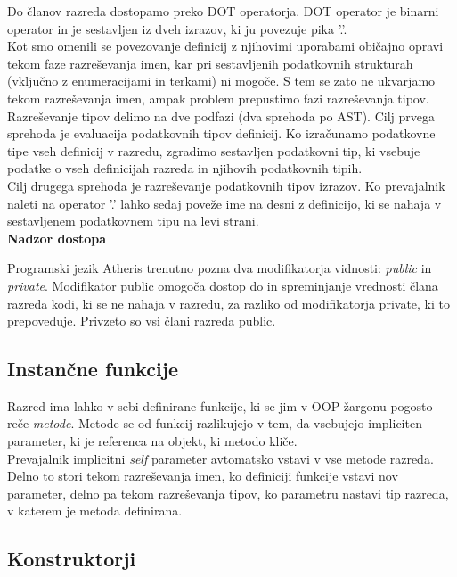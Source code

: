 \documentclass[a4paper, 12p]{book}
\begin{document}
Do članov razreda dostopamo preko DOT operatorja. DOT operator je binarni operator in je sestavljen iz dveh izrazov, ki ju povezuje pika '.'. \\
\indent Kot smo omenili se povezovanje definicij z njihovimi uporabami običajno opravi tekom faze razreševanja imen, kar pri sestavljenih podatkovnih strukturah (vključno z enumeracijami in terkami) ni mogoče. S tem se zato ne ukvarjamo tekom razreševanja imen, ampak problem prepustimo fazi razreševanja tipov. \\
\indent Razreševanje tipov delimo na dve podfazi (dva sprehoda po AST). Cilj prvega sprehoda je evaluacija podatkovnih tipov definicij. Ko izračunamo podatkovne tipe vseh definicij v razredu, zgradimo sestavljen podatkovni tip, ki vsebuje podatke o vseh definicijah razreda in njihovih podatkovnih tipih. \\ 
\indent Cilj drugega sprehoda je razreševanje podatkovnih tipov izrazov. Ko prevajalnik naleti na operator '.' lahko sedaj poveže ime na desni z definicijo, ki se nahaja v sestavljenem podatkovnem tipu na levi strani.\\

\noindent \textbf{Nadzor dostopa}

\noindent Programski jezik Atheris trenutno pozna dva modifikatorja vidnosti: \textit{public} in \textit{private}. Modifikator public omogoča dostop do in spreminjanje vrednosti člana razreda kodi, ki se ne nahaja v razredu, za razliko od modifikatorja private, ki to prepoveduje. Privzeto so vsi člani razreda public. 
\subsection{Instančne funkcije}

Razred ima lahko v sebi definirane funkcije, ki se jim v OOP žargonu pogosto reče \textit{metode}. Metode se od funkcij razlikujejo v tem, da vsebujejo impliciten parameter, ki je referenca na objekt, ki metodo kliče.  \\
\indent Prevajalnik implicitni \textit{self} parameter avtomatsko vstavi v vse metode razreda. Delno to stori tekom razreševanja imen, ko definiciji funkcije vstavi nov parameter, delno pa tekom razreševanja tipov, ko parametru nastavi tip razreda, v katerem je metoda definirana.

\subsection{Konstruktorji}
\end{document}
